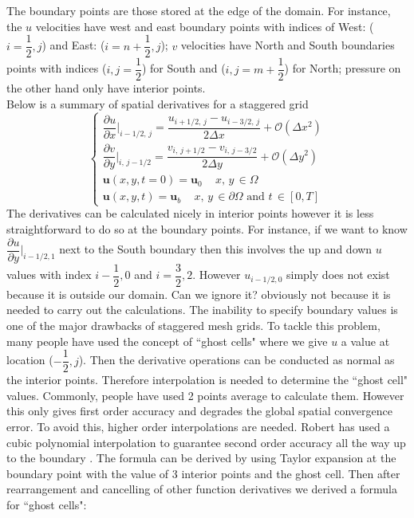 The boundary points are those stored at the edge of the domain. For instance, the $u$ velocities have west and east boundary points with indices of West: ($i=\dfrac{1}{2},j$) and East: ($i=n+\dfrac{1}{2},j$); $v$ velocities have North and South boundaries points with indices ($i,j=\dfrac{1}{2}$) for South and ($i,j=m+\dfrac{1}{2}$) for North; pressure on the other hand only have interior points.\\
Below is a summary of spatial derivatives for a staggered grid
\begin{equation}
\begin{cases}
\dfrac{\partial u}{\partial x}|_{i-1/2,\,j} = \dfrac{u_{i+1/2,\,j} - u_{i-3/2,\,j}}{2\Delta x} + \mathcal{O}(\Delta x^2)\\
\dfrac{\partial v}{\partial y}|_{i,\,j-1/2} = \dfrac{v_{i,\,j+1/2} - v_{i,\,j-3/2}}{2\Delta y} + \mathcal{O}(\Delta y^2)\\
\textbf{u}(x,y,t=0) = \textbf{u}_0\,\,\,\text{   $x,\,y\,\in \Omega$}\\
\textbf{u}(x,y,t) = \textbf{u}_b\,\,\,\text{   $x,\,y\,\in \partial\Omega$ and $t\,\in [0,T]$}
\end{cases}
\end{equation} 
The derivatives can be calculated nicely in interior points however it is less straightforward to do so at the boundary points. For instance, if we want to know $\dfrac{\partial u}{\partial y}|_{i-1/2,1}$ next to the South boundary then this involves the up and down $u$ values with index $i-\dfrac{1}{2},0$ and $i=\dfrac{3}{2},2$. However $u_{i-1/2,0}$ simply does not exist because it is outside our domain. Can we ignore it? obviously not because it is needed to carry out the calculations. The inability to specify boundary values is one of the major drawbacks of staggered mesh grids. To tackle this problem, many people have used the concept of ``ghost cells" where we give $u$ a value at location ($-\dfrac{1}{2},j$). Then the derivative operations can be conducted as normal as the interior points. Therefore interpolation is needed to determine the ``ghost cell" values. Commonly, people have used 2 points average to calculate them. However this only gives first order accuracy and degrades the global spatial convergence error. To avoid this, higher order interpolations are needed. Robert has used a cubic polynomial interpolation to guarantee second order accuracy all the way up to the boundary \cite{sayenavierstokesmodule}. The formula can be derived by using Taylor expansion at the boundary point with the value of 3 interior points and the ghost cell. Then after rearrangement and cancelling of other function derivatives we derived a formula for ``ghost cells":\\
